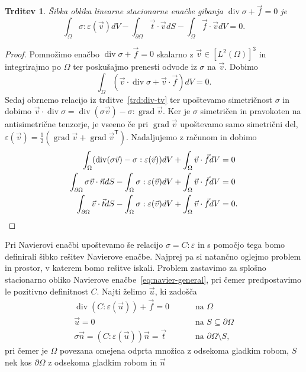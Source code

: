 \documentclass[12pt,a4paper,twoside]{article}
\theoremstyle{definition} %
\theoremstyle{plain} %
\newtheorem{trditev}[definicija]{Trditev}
\numberwithin{equation}{section}
\newcommand{\T}{\mathsf{T}}
\renewcommand{\div}{\operatorname{div}}
\newcommand{\grad}{\operatorname{grad}}
\newcommand{\eps}{\varepsilon}
\newcommand{\vv}{\vec{v}}
\newcommand{\vt}{\vec{t}}
\newcommand{\vu}{\vec{u}}
\newcommand{\vn}{\vec{n}}
\newcommand{\vf}{\vec{f}}
\newcommand{\ts}{\sigma}
\begin{document}
\begin{trditev}
  Šibka oblika linearne stacionarne enačbe gibanja $\div \ts + \vf = 0$ je
  \begin{equation}
  \int_{\Omega}\ts : \eps(\vv) dV - \int_{\partial \Omega} \vt\cdot \vv dS -
    \int_{\Omega} \vf\cdot \vv dV = 0.
    \label{eq:cauchy-sibka}
  \end{equation}
\end{trditev}
\begin{proof}
Pomnožimo enačbo $\div\ts + \vf = 0$ skalarno z $\vv \in [L^2(\Omega)]^3$ in integrirajmo po
$\Omega$ ter poskušajmo prenesti odvode iz $\ts$ na $\vv$. Dobimo
\[
  \int_{\Omega}(\vv\cdot\div \ts + \vv\cdot\vf)dV = 0.
\]
Sedaj obrnemo relacijo iz trditve~\ref{trd:div-tv} ter upoštevamo simetričnost
$\ts$ in dobimo $\vv\cdot\div\ts = \div(\sigma \vv) - \sigma:\grad \vv$.
Ker je $\ts$ simetričen in pravokoten na antisimetrične tenzorje, je vseeno če
pri $\grad\vv$ upoštevamo samo simetrični del, $\eps(\vv) =
\frac12(\grad\vv+\grad\vv^\T)$. Nadaljujemo z računom in dobimo
\begin{align*}
\int_{\Omega}(\div(\sigma \vv) - \ts:\eps(\vv)) dV + \int_{\Omega} \vv\cdot\vf dV &= 0 \\
\int_{\partial \Omega}\sigma \vv \cdot \vn dS - \int_\Omega\ts:\eps(\vv) dV +
\int_{\Omega} \vv\cdot\vf dV &= 0 \\
\int_{\partial \Omega}\vv \cdot \vt dS - \int_\Omega\ts:\eps(\vv) dV +
\int_{\Omega} \vv\cdot\vf dV &= 0. \qedhere
\end{align*}
\end{proof}
Pri Navierovi enačbi upoštevamo še relacijo $\ts = C:\eps$ in s pomočjo tega
bomo definirali šibko rešitev Navierove enačbe. Najprej pa si natančno oglejmo
problem in prostor, v katerem bomo rešitve iskali.  Problem zastavimo za splošno
stacionarno obliko Navierove enačbe~\eqref{eq:navier-general}, pri čemer
predpostavimo le pozitivno definitnost $C$. Najti želimo $\vu$,
ki zadošča
\begin{align}
  \div(C:\eps(\vu)) + \vf = 0 &\qquad \text{ na } \Omega
  \label{eq:navier-general-problem} \\
  \vu = 0 &\qquad \text{ na } S \subseteq \partial\Omega \nonumber \\
  \ts\vn = (C:\eps(\vu))\vn = \vt &\qquad \text{ na } \partial\Omega \setminus
  S, \nonumber
\end{align}
pri čemer je $\Omega$ povezana omejena odprta množica z odsekoma gladkim robom,
$S$ nek kos $\partial\Omega$ z odsekoma gladkim robom in $\vn$
\end{document}
